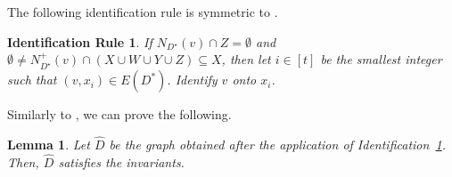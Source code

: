 \documentclass[a4paper,11pt]{article}
\theoremstyle{plain}
\newtheorem{lemma}[theorem]{Lemma}
\newtheorem{identification rule}{Identification Rule}
\theoremstyle{definition}
\theoremstyle{remark}
\begin{document}
The following identification rule is symmetric to .

\begin{identification rule}\label{ir:emptyD}
If $N_{D^{\star}}(v) \cap Z=\emptyset$ and $\emptyset \neq N_{D^{\star}}^+(v) \cap (X \cup W \cup Y \cup Z) \subseteq X$, then 
let $i \in [t]$ be the smallest integer such that $(v,x_i) \in E(D^*)$.
Identify $v$ onto $x_{i}$.
\end{identification rule}

Similarly to , we can prove the following.

\begin{lemma}\label{lem:iremptyD-safe}
Let $\widehat{D}$ be the graph obtained after the application of Identification~\ref{ir:emptyD}. Then, $\widehat{D}$ satisfies the invariants.
\end{lemma}
\end{document}
